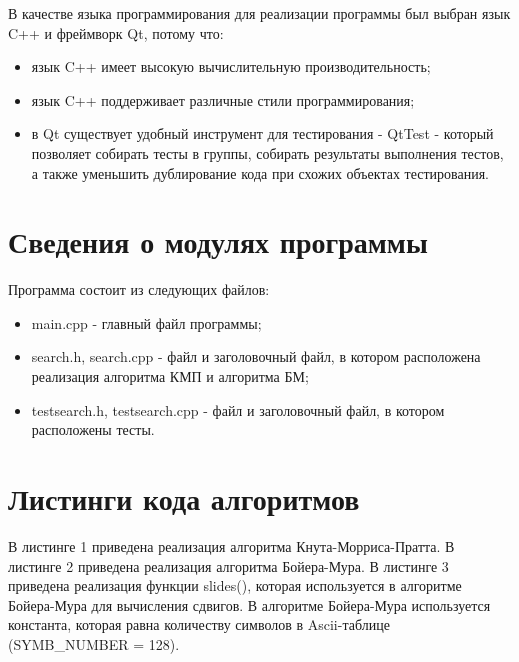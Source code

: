 \documentclass[a4paper,14pt]{report}
\begin{document}
В качестве языка программирования для реализации программы был выбран язык C++ и фреймворк Qt, потому что:
\begin{itemize}
	\item язык C++ имеет высокую вычислительную производительность;
	\item язык C++ поддерживает различные стили программирования;
	\item в Qt существует удобный инструмент для тестирования - QtTest - который позволяет собирать тесты в группы, собирать результаты выполнения тестов, а также уменьшить дублирование кода при схожих объектах тестирования.
\end{itemize}

\section*{Сведения о модулях программы}

Программа состоит из следующих файлов:
\begin{itemize}
	\item main.cpp - главный файл программы;
	\item search.h, search.cpp - файл и заголовочный файл, в котором расположена реализация алгоритма КМП и алгоритма БМ;
	\item testsearch.h, testsearch.cpp - файл и заголовочный файл, в котором расположены тесты.
\end{itemize}

\section*{Листинги кода алгоритмов}

В листинге 1 приведена реализация алгоритма Кнута-Морриса-Пратта. В листинге 2 приведена реализация алгоритма Бойера-Мура. В листинге 3 приведена реализация функции slides(), которая используется в алгоритме Бойера-Мура для вычисления сдвигов. В алгоритме Бойера-Мура используется константа, которая равна количеству символов в Ascii-таблице (SYMB\_NUMBER = 128).
\end{document}
